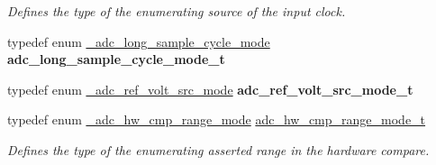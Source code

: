 \begin{DoxyCompactItemize}
\begin{DoxyCompactList}\small\item\em Defines the type of the enumerating source of the input clock. \end{DoxyCompactList}\item 
typedef enum \hyperlink{group__adc__hal_gaf94ec953aeb0bd7abe1364f39e75b135}{\+\_\+adc\+\_\+long\+\_\+sample\+\_\+cycle\+\_\+mode} {\bfseries adc\+\_\+long\+\_\+sample\+\_\+cycle\+\_\+mode\+\_\+t}\hypertarget{group__adc__hal_gad56e16cef5f6ada53251af8b96e6660b}{}\label{group__adc__hal_gad56e16cef5f6ada53251af8b96e6660b}

\item 
typedef enum \hyperlink{group__adc__hal_gaba9f6fde8624e91c053734dd84478b8e}{\+\_\+adc\+\_\+ref\+\_\+volt\+\_\+src\+\_\+mode} {\bfseries adc\+\_\+ref\+\_\+volt\+\_\+src\+\_\+mode\+\_\+t}\hypertarget{group__adc__hal_ga1705254391a537e1422dd54b9fba9b71}{}\label{group__adc__hal_ga1705254391a537e1422dd54b9fba9b71}

\item 
typedef enum \hyperlink{group__adc__hal_ga14559d14c936d0c6955676098ed26a08}{\+\_\+adc\+\_\+hw\+\_\+cmp\+\_\+range\+\_\+mode} \hyperlink{group__adc__hal_ga233a744e31dcfed41f7cefadda54b592}{adc\+\_\+hw\+\_\+cmp\+\_\+range\+\_\+mode\+\_\+t}
\begin{DoxyCompactList}\small\item\em Defines the type of the enumerating asserted range in the hardware compare. \end{DoxyCompactList}\end{DoxyCompactItemize}
